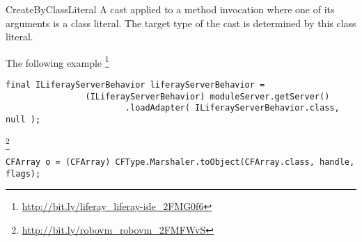 \begin{pattern}{CreateByClassLiteral}
A cast applied to a method invocation where one of its arguments is a class literal.
The target type of the cast is determined by this class literal.

\instances{}
The following example 
\footnote{\url{http://bit.ly/liferay_liferay-ide_2FMG0f6}}

\begin{verbatim}
final ILiferayServerBehavior liferayServerBehavior =
                (ILiferayServerBehavior) moduleServer.getServer()
                        .loadAdapter( ILiferayServerBehavior.class, null );
\end{verbatim}


\footnote{\url{http://bit.ly/robovm_robovm_2FMFWvS}}

\begin{verbatim}
CFArray o = (CFArray) CFType.Marshaler.toObject(CFArray.class, handle, flags);
\end{verbatim}

\detection{}

\discussion{}

\related{}

\end{pattern}